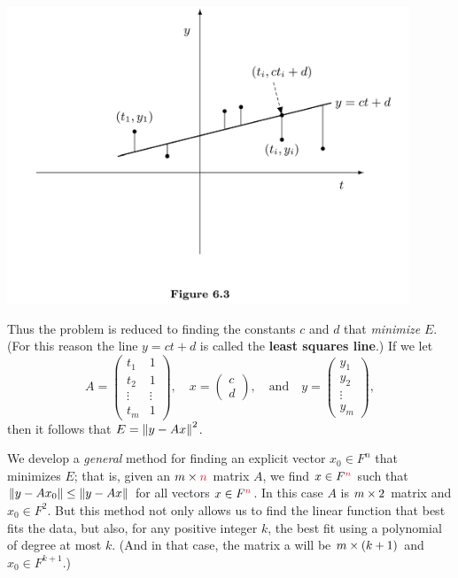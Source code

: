\begin{center}
    \includegraphics[width=12cm]{images/figure-6-3.png}
\end{center}

Thus the problem is reduced to finding the constants \(c\) and \(d\) that \emph{minimize} \(E\).
(For this reason the line \(y = ct + d\) is called the \textbf{least squares line}.)
If we let
\[
    A = \begin{pmatrix} t_1 & 1 \\ t_2 & 1 \\ \vdots & \vdots \\ t_m & 1 \end{pmatrix}, \quad x = \begin{pmatrix} c \\ d \end{pmatrix}, \quad \text{and} \quad y = \begin{pmatrix} y_1 \\ y_2 \\ \vdots \\ y_m \end{pmatrix},
\]
then it follows that \(E = \left\lVert y - Ax\right\rVert^2\).

We develop a \emph{general} method for finding an explicit vector \(x_0 \in F^n\) that minimizes \(E\);
that is, given an \(m \X \RED{n}\) matrix \(A\), we find \(x \in F^{\RED{n}}\) such that \(\left\lVert y - Ax_0\right\rVert \le \left\lVert y - Ax\right\rVert\) for all vectors \(x \in F^{\RED{n}}\).
In this case \(A\) is \(m \times 2\) matrix and \(x_0 \in F^2\).
But this method not only allows us to find the linear function that best fits the data, but also, for any positive integer \(k\), the best fit using a polynomial of degree at most \(k\).
(And in that case, the matrix a will be \(m \times (k + 1)\) and \(x_0 \in F^{k + 1}\).)

